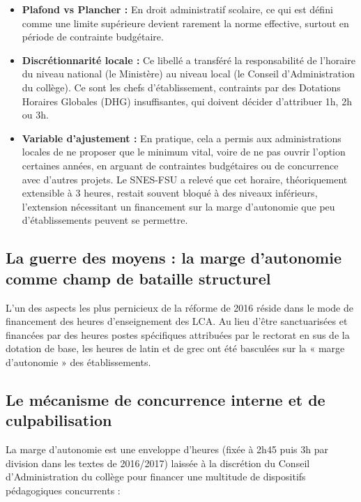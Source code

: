\begin{itemize}\item \textbf{Plafond vs Plancher :} En droit administratif scolaire, ce qui est défini comme une limite supérieure devient rarement la norme effective, surtout en période de contrainte budgétaire.\item \textbf{Discrétionnarité locale :} Ce libellé a transféré la responsabilité de l'horaire du niveau national (le Ministère) au niveau local (le Conseil d'Administration du collège). Ce sont les chefs d'établissement, contraints par des Dotations Horaires Globales (DHG) insuffisantes, qui doivent décider d'attribuer 1h, 2h ou 3h.\item \textbf{Variable d'ajustement :} En pratique, cela a permis aux administrations locales de ne proposer que le minimum vital, voire de ne pas ouvrir l'option certaines années, en arguant de contraintes budgétaires ou de concurrence avec d'autres projets. Le SNES-FSU a relevé que cet horaire, théoriquement extensible à 3 heures, restait souvent bloqué à des niveaux inférieurs, l'extension nécessitant un financement sur la marge d'autonomie que peu d'établissements peuvent se permettre.\cite{I-3-2-ref1}\end{itemize}

\subsection{La guerre des moyens : la marge d'autonomie comme champ de bataille structurel}

L'un des aspects les plus pernicieux de la réforme de 2016 réside dans le mode de financement des
heures d'enseignement des LCA. Au lieu d'être sanctuarisées et financées par des heures postes
spécifiques attribuées par le rectorat en sus de la dotation de base, les heures de latin et de grec
ont été basculées sur la « marge d'autonomie » des établissements.\cite{I-3-2-ref1}



\subsection{Le mécanisme de concurrence interne et de culpabilisation}

La marge d'autonomie est une enveloppe d'heures (fixée à 2h45 puis 3h par division dans les textes
de 2016/2017) laissée à la discrétion du Conseil d'Administration du collège pour financer une
multitude de dispositifs pédagogiques concurrents :

